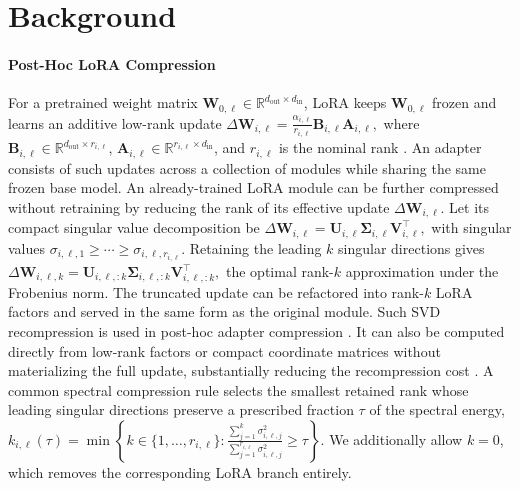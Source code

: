\documentclass{article}
\newcommand{\mat}[1]{\bm{#1}}
\begin{document}
\section{Background}
\label{sec:background}

\paragraph{Post-Hoc LoRA Compression}
For a pretrained weight matrix
$\mat W_{0,\ell}\in\mathbb{R}^{d_{\mathrm{out}}\times d_{\mathrm{in}}}$,
LoRA keeps $\mat W_{0,\ell}$ frozen and learns an additive low-rank update
$
  \Delta\mat W_{i,\ell}
  =
  \frac{\alpha_{i,\ell}}{r_{i,\ell}}
  \mat B_{i,\ell}\mat A_{i,\ell},
  \label{eq:lora-update}
$
where
$\mat B_{i,\ell}\in\mathbb{R}^{d_{\mathrm{out}}\times r_{i,\ell}}$,
$\mat A_{i,\ell}\in\mathbb{R}^{r_{i,\ell}\times d_{\mathrm{in}}}$,
and $r_{i,\ell}$ is the nominal rank \citep{hu2022lora}.
An adapter consists of such updates across a collection of modules while
sharing the same frozen base model. An already-trained LoRA module can be further compressed without retraining by
reducing the rank of its effective update $\Delta\mat W_{i,\ell}$. Let its
compact singular value decomposition be
$
  \Delta\mat W_{i,\ell}
  =
  \mat U_{i,\ell}
  \mat\Sigma_{i,\ell}
  \mat V_{i,\ell}^{\top},
  \label{eq:lora-svd}
$
with singular values
$\sigma_{i,\ell,1}\ge\cdots\ge\sigma_{i,\ell,r_{i,\ell}}$.
Retaining the leading $k$ singular directions gives
$
  \Delta\mat W_{i,\ell,k}
  =
  \mat U_{i,\ell,:k}
  \mat\Sigma_{i,\ell,:k}
  \mat V_{i,\ell,:k}^{\top},
  \label{eq:lora-truncation}
$
the optimal rank-$k$ approximation under the Frobenius norm. The truncated
update can be refactored into rank-$k$ LoRA factors and served in the same form
as the original module. Such SVD recompression is used in post-hoc adapter
compression \citep{brueelgabrielsson2024compressthenserve,kumaravelu2026para}.
It can also be computed directly from low-rank factors or compact coordinate
matrices without materializing the full update, substantially reducing the
recompression cost \citep{kumaravelu2026para,li2026fraq}. A common spectral compression rule selects the smallest retained rank whose
leading singular directions preserve a prescribed fraction $\tau$ of the
spectral energy,
$
  k_{i,\ell}(\tau)
  =
  \min\left\{
  k\in\{1,\ldots,r_{i,\ell}\}:
  \frac{\sum_{j=1}^{k}\sigma_{i,\ell,j}^{2}}
       {\sum_{j=1}^{r_{i,\ell}}\sigma_{i,\ell,j}^{2}}
  \ge \tau
  \right\}.
  \label{eq:spectral-rank}
$
We additionally allow $k=0$, which removes the corresponding LoRA branch
entirely.
\end{document}
